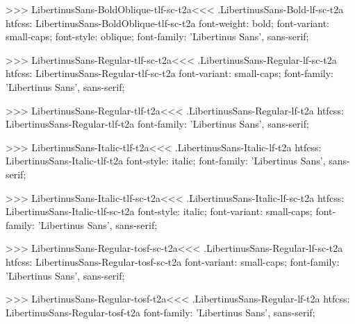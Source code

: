 {{{{>>>
\<LibertinusSans-BoldOblique-tlf-sc-t2a\><<<
.LibertinusSans-Bold-lf-sc-t2a
htfcss:  LibertinusSans-BoldOblique-tlf-sc-t2a  font-weight: bold; font-variant: small-caps; font-style: oblique; font-family: 'Libertinus Sans', sans-serif;

>>>
\<LibertinusSans-Regular-tlf-sc-t2a\><<<
.LibertinusSans-Regular-lf-sc-t2a
htfcss:  LibertinusSans-Regular-tlf-sc-t2a  font-variant: small-caps; font-family: 'Libertinus Sans', sans-serif;

>>>
\<LibertinusSans-Regular-tlf-t2a\><<<
.LibertinusSans-Regular-lf-t2a
htfcss:  LibertinusSans-Regular-tlf-t2a  font-family: 'Libertinus Sans', sans-serif;

>>>
\<LibertinusSans-Italic-tlf-t2a\><<<
.LibertinusSans-Italic-lf-t2a
htfcss:  LibertinusSans-Italic-tlf-t2a  font-style: italic; font-family: 'Libertinus Sans', sans-serif;

>>>
\<LibertinusSans-Italic-tlf-sc-t2a\><<<
.LibertinusSans-Italic-lf-sc-t2a
htfcss:  LibertinusSans-Italic-tlf-sc-t2a  font-style: italic; font-variant: small-caps; font-family: 'Libertinus Sans', sans-serif;

>>>
\<LibertinusSans-Regular-tosf-sc-t2a\><<<
.LibertinusSans-Regular-lf-sc-t2a
htfcss:  LibertinusSans-Regular-tosf-sc-t2a  font-variant: small-caps; font-family: 'Libertinus Sans', sans-serif;

>>>
\<LibertinusSans-Regular-tosf-t2a\><<<
.LibertinusSans-Regular-lf-t2a
htfcss:  LibertinusSans-Regular-tosf-t2a  font-family: 'Libertinus Sans', sans-serif;

}}}}
